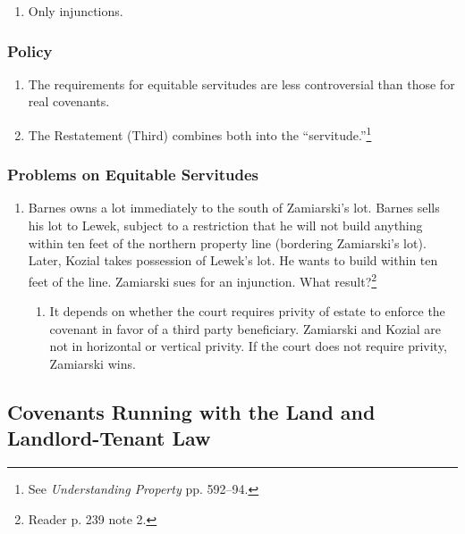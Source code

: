 \begin{enumerate}
    \item Only injunctions.
\end{enumerate}

\subsubsection{Policy}

\begin{enumerate}
    \item The requirements for equitable servitudes are less controversial 
    than those for real covenants.
    \item The Restatement (Third) combines both into the 
    ``servitude.''\footnote{See \emph{Understanding Property} pp. 592--94.}
\end{enumerate}

\subsubsection{Problems on Equitable Servitudes}

\begin{enumerate}
    \item Barnes owns a lot immediately to the south of Zamiarski's lot. 
    Barnes sells his lot to Lewek, subject to a restriction that he will not 
    build anything within ten feet of the northern property line (bordering 
    Zamiarski's lot). Later, Kozial takes possession of Lewek's lot. He wants 
    to build within ten feet of the line. Zamiarski sues for an injunction. 
    What result?\footnote{Reader p. 239 note 2.}
    \begin{enumerate}
        \item It depends on whether the court requires privity of estate to 
        enforce the covenant in favor of a third party beneficiary. Zamiarski 
        and Kozial are not in horizontal or vertical privity. If the court 
        does not require privity, Zamiarski wins.
    \end{enumerate}
\end{enumerate}

\subsection{Covenants Running with the Land and Landlord-Tenant Law}

